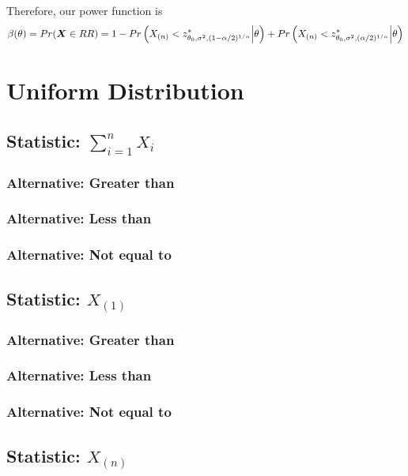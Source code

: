 \documentclass[]{article}
\newcommand{\bfX}{\mbox{\boldmath $X$}}
\begin{document}
Therefore, our power function is
\[
\beta(\theta) = Pr(\bfX \in RR) = 1 - Pr\left(X_{(n)} < z^*_{\theta_0, \sigma^2, (1 - \alpha/2)^{1/n}} \Big| \theta\right) + Pr\left(X_{(n)} < z^*_{\theta_0, \sigma^2, (\alpha/2)^{1/n}} \Big| \theta\right)
\]

\section{Uniform Distribution}

\subsection{Statistic: $\sum_{i=1}^n X_i$}

\subsubsection{Alternative: Greater than}

\subsubsection{Alternative: Less than}

\subsubsection{Alternative: Not equal to}

\subsection{Statistic: $X_{(1)}$}

\subsubsection{Alternative: Greater than}

\subsubsection{Alternative: Less than}

\subsubsection{Alternative: Not equal to}

\subsection{Statistic: $X_{(n)}$}
\end{document}
